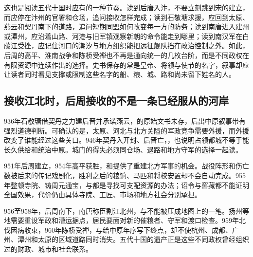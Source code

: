 这也是阅读五代十国时应有的一种节奏。读到后唐入汴，不要立刻跳到宋的建立，而应停在汴州的官署和仓场，追问接收怎样完成；读到石敬瑭求援，应回到太原、燕云和契丹南下的道路，追问短期同盟如何改变每一方的防务；读到南唐进入建州或潭州，应沿着山路、河港与旧军镇观察新朝的命令能走到哪里；读到南汉军在白藤江受挫，应记住河口的潮汐与地方组织能把远征舰队挡在政治控制之外。如此，后周的高平、淮南战争和陈桥受禅也不再是通向统一的几枚台阶，而是不同政权在有限资源中连续作出的选择。史书保存的常是皇帝、将领与使节的名字，叙事却应让读者同时看见支撑或限制这些名字的船、粮、城、路和尚未留下姓名的人。

\subsection{接收江北时，后周接收的不是一条已经服从的河岸}
936年石敬瑭借契丹之力建后晋并承诺燕云，的原始文书未存，后出中原叙事带有强烈道德判断。可确认的是，太原、河北与北方关隘的军政竞争需要外援，而外援改变了谁能经过这些关口。946年契丹入开封、后晋亡，，也说明占领都城不等于能长久供给和统治中原。城门的得失必须同仓场、退路和地方守军的选择一起读。

951年后周建立，954年高平获胜，和提供了重建北方军事的机会。战役阵形和伤亡数被后来的传记戏剧化，胜利之后的粮饷、马匹和将校安置却不会自动完成。955年整顿寺院、铸周元通宝，与都是寻找可支配资源的办法；诏令与窖藏都不能证明全国效果，代价仍由具体寺院、工匠、市场和地方社会分别承担。

956至958年，后周南下，南唐称臣割江北州，与不能被压成地图上的一笔。扬州等地需要重设军政和漕运据点，居民要面对新的催粮者、守军和渡口检查。959年北伐因病收束，960年陈桥受禅，与给中原年序写下终点，却不使杭州、成都、广州、潭州和太原的区域道路同时消失。五代十国的遗产正是这些不同政权曾经组织过的财政、城市和社会联系。
